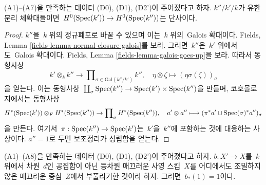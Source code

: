 \begin{lemma}
\label{lemma-injective-H0}
(A1)--(A7)을 만족하는 데이터 (D0), (D1), (D2')이 주어졌다고 하자.
$k''/k'/k$가 유한 분리 체확대들이면\ 
$H^0(\mathop{\mathrm{Spec}}(k')) \to H^0(\mathop{\mathrm{Spec}}(k''))$는 단사이다.
\end{lemma}

\begin{proof}
$k''$을\  $k$ 위의 정규폐포로 바꿀 수 있으며 이는\  $k$ 위의\  Galois
확대이다. Fields, Lemma \ref{fields-lemma-normal-closure-galois}를
보라. 그러면\  $k''$은\  $k'$ 위에서도\  Galois 확대이다. Fields, Lemma
\ref{fields-lemma-galois-goes-up}을 보라. 따라서 동형사상
$$
k' \otimes_k k'' \longrightarrow
\prod\nolimits_{\sigma \in \text{Gal}(k''/k')} k'',\quad
\eta \otimes \zeta \longmapsto (\eta \sigma(\zeta))_\sigma
$$
을 얻는다. 이는 동형사상\ 
$\coprod_\sigma \mathop{\mathrm{Spec}}(k'') \to \mathop{\mathrm{Spec}}(k') \times \mathop{\mathrm{Spec}}(k'')$을 만들며,
코호몰로지에서는 동형사상
$$
H^*(\mathop{\mathrm{Spec}}(k')) \otimes_F H^*(\mathop{\mathrm{Spec}}(k''))
\to
\prod\nolimits_\sigma H^*(\mathop{\mathrm{Spec}}(k'')),\quad
a' \otimes a'' \longmapsto (\pi^*a' \cup \mathop{\mathrm{Spec}}(\sigma)^*a'')_\sigma
$$
을 만든다. 여기서\  $\pi : \mathop{\mathrm{Spec}}(k'') \to \mathop{\mathrm{Spec}}(k')$는\  $k'$을\ 
$k''$에 포함하는 것에 대응하는 사상이다. $a'' = 1$로 두면
보조정리가 성립함을 얻는다.
\end{proof}

\begin{lemma}
\label{lemma-pushforward-blowup}
(A1)--(A8)을 만족하는 데이터 (D0), (D1), (D2')이 주어졌다고 하자.
$b : X' \to X$를\  $k$ 위에서 차원\  $d$인 공집합이 아닌 등차원
매끄러운 사영 스킴\  $X$를 어디에서도 조밀하지 않은 매끄러운 중심\ 
$Z$에서 부풀리기한 것이라 하자. 그러면\  $b_*(1) = 1$이다.
\end{lemma}

